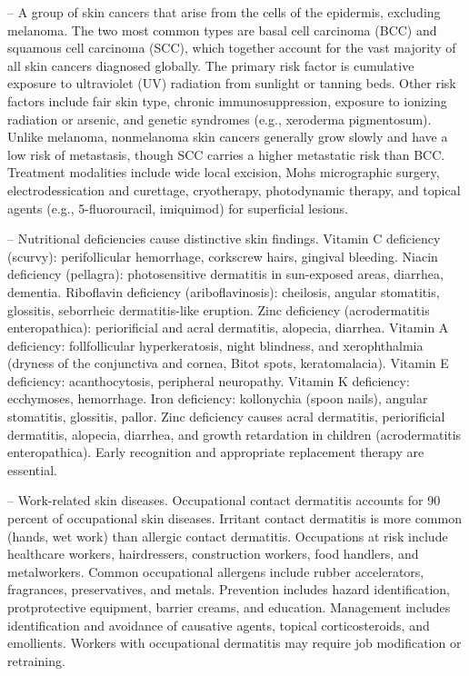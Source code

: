 -- A group of skin cancers that arise from the cells of the epidermis, excluding melanoma. The two most common types are basal cell carcinoma (BCC) and squamous cell carcinoma (SCC), which together account for the vast majority of all skin cancers diagnosed globally. The primary risk factor is cumulative exposure to ultraviolet (UV) radiation from sunlight or tanning beds. Other risk factors include fair skin type, chronic immunosuppression, exposure to ionizing radiation or arsenic, and genetic syndromes (e.g., xeroderma pigmentosum). Unlike melanoma, nonmelanoma skin cancers generally grow slowly and have a low risk of metastasis, though SCC carries a higher metastatic risk than BCC. Treatment modalities include wide local excision, Mohs micrographic surgery, electrodessication and curettage, cryotherapy, photodynamic therapy, and topical agents (e.g., 5-fluorouracil, imiquimod) for superficial lesions.

-- Nutritional deficiencies cause distinctive skin findings. Vitamin C deficiency (scurvy): perifollicular hemorrhage, corkscrew hairs, gingival bleeding. Niacin deficiency (pellagra): photosensitive dermatitis in sun-exposed areas, diarrhea, dementia. Riboflavin deficiency (ariboflavinosis): cheilosis, angular stomatitis, glossitis, seborrheic dermatitis-like eruption. Zinc deficiency (acrodermatitis enteropathica): periorificial and acral dermatitis, alopecia, diarrhea. Vitamin A deficiency: follfollicular hyperkeratosis, night blindness, and xerophthalmia (dryness of the conjunctiva and cornea, Bitot spots, keratomalacia). Vitamin E deficiency: acanthocytosis, peripheral neuropathy. Vitamin K deficiency: ecchymoses, hemorrhage. Iron deficiency: kollonychia (spoon nails), angular stomatitis, glossitis, pallor. Zinc deficiency causes acral dermatitis, periorificial dermatitis, alopecia, diarrhea, and growth retardation in children (acrodermatitis enteropathica). Early recognition and appropriate replacement therapy are essential.

-- Work-related skin diseases. Occupational contact dermatitis accounts for 90 percent of occupational skin diseases. Irritant contact dermatitis is more common (hands, wet work) than allergic contact dermatitis. Occupations at risk include healthcare workers, hairdressers, construction workers, food handlers, and metalworkers. Common occupational allergens include rubber accelerators, fragrances, preservatives, and metals. Prevention includes hazard identification, protprotective equipment, barrier creams, and education. Management includes identification and avoidance of causative agents, topical corticosteroids, and emollients. Workers with occupational dermatitis may require job modification or retraining.

